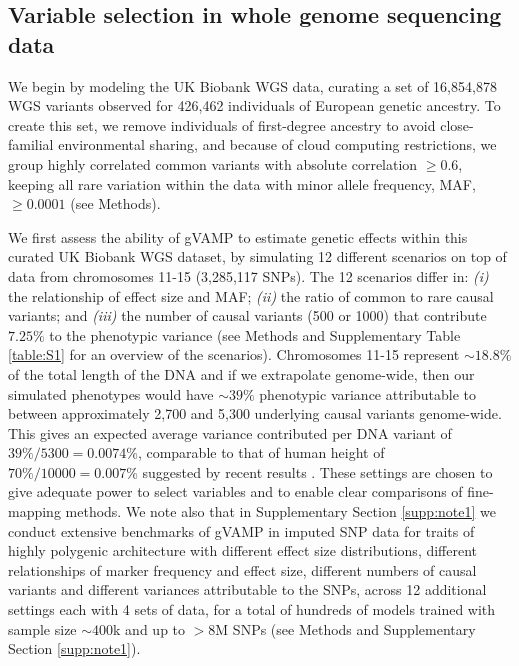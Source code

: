 \subsection{Variable selection in whole genome sequencing data}
We begin by modeling the UK Biobank WGS data, curating a set of 16,854,878 WGS variants observed for 426,462 individuals of European genetic ancestry. To create this set, we remove individuals of first-degree ancestry to avoid close-familial environmental sharing, and because of cloud computing restrictions, we group highly correlated common variants with absolute correlation $\geq0.6$, keeping all rare variation within the data with minor allele frequency, MAF, $\geq 0.0001$ (see Methods).

We first assess the ability of gVAMP to estimate genetic effects within this curated UK Biobank WGS dataset, by simulating 12 different scenarios on top of data from chromosomes 11-15 (3,285,117 SNPs). The 12 scenarios differ in: \emph{(i)} the relationship of effect size and MAF; \emph{(ii)} the ratio of common to rare causal variants; and \emph{(iii)} the number of causal variants (500 or 1000) that contribute $7.25\% $ to the phenotypic variance (see Methods and Supplementary Table \ref{table:S1} for an overview of the scenarios). Chromosomes 11-15 represent $\sim 18.8\%$ of the total length of the DNA and if we extrapolate genome-wide, then our simulated phenotypes would have $\sim 39\%$ phenotypic variance attributable to between approximately 2,700 and 5,300 underlying causal variants genome-wide. This gives an expected average variance contributed per DNA variant of $39\% / 5300 = 0.0074\%$, comparable to that of human height of $70\% / 10000 = 0.007\%$ suggested by recent results \cite{HTbig}. These settings are chosen to give adequate power to select variables and to enable clear comparisons of fine-mapping methods. We note also that in Supplementary Section \ref{supp:note1} we conduct extensive benchmarks of gVAMP in imputed SNP data for traits of highly polygenic architecture with different effect size distributions, different relationships of marker frequency and effect size, different numbers of causal variants and different variances attributable to the SNPs, across 12 additional settings each with 4 sets of data, for a total of hundreds of models trained with sample size $\sim 400$k and up to $>8$M SNPs (see Methods and Supplementary Section \ref{supp:note1}).

